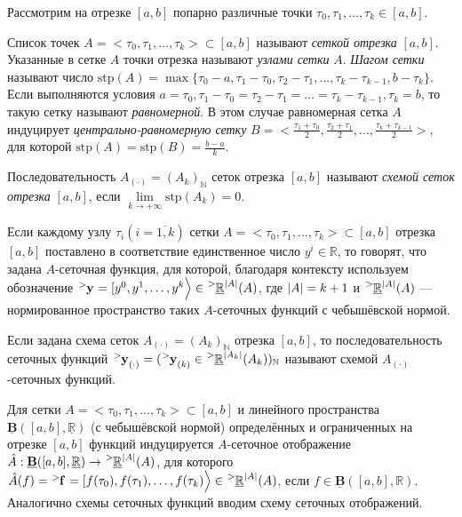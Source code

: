
Рассмотрим на отрезке $[a, b]$ попарно различные точки $\tau_0, \tau_1, \dots, \tau_k \in [a, b]$.

\begin{definition}
	Список точек $A = \Big<\tau_0, \tau_1, \dots, \tau_k\Big> \subset [a, b]$ называют \textit{сеткой отрезка} $[a, b]$. Указанные в сетке $A$ точки отрезка называют \textit{узлами сетки} $A$. \textit{Шагом сетки} называют число $\mathrm{stp}(A) = \max\{\tau_0 - a, \tau_1 - \tau_0, \tau_2 - \tau_1, \dotsc, \tau_k - \tau_{k - 1}, b - \tau_k\}$. Если выполняются условия $a = \tau_0, \tau_1 - \tau_0 = \tau_2 - \tau_1 = \dotsc = \tau_k - \tau_{k - 1}, \tau_k = b$, то такую сетку называют \textit{равномерной}. В этом случае равномерная сетка $A$ индуцирует \textit{центрально-равномерную сетку} $B = \Big<\frac{\tau_1 + \tau_0}{2}, \frac{\tau_2 + \tau_1}{2}, \dotsc, \frac{\tau_k + \tau_{k - 1}}{2}\Big>$, для которой $\mathrm{stp}(A) = \mathrm{stp}(B) = \frac{b - a}{k}$. 
	
	Последовательность $A_{(\cdot)} = (A_k)_{\mathbb{N}}$ сеток отрезка $[a, b]$ называют \textit{схемой сеток отрезка} $[a, b]$, если $\lim\limits_{k \to +\infty}{\mathrm{stp}(A_k)} = 0$.
	
	Если каждому узлу $\tau_i (i = \overline{1, k})$ сетки $A = \Big<\tau_0, \tau_1, \dotsc, \tau_k\Big> \subset [a, b]$ отрезка $[a, b]$ поставлено в соответствие единственное число $y^i \in \mathbb{R}$, то говорят, что задана $A$-сеточная функция, для которой, благодаря контексту используем обозначение $\tensor[^{>}]{\mathbf{y}}{} = [y^0, y^1, \dotsc, y^k\Big> \in \tensor[^{>}]{\underline{\mathbb{R}}}{^{\abs{A}}}(A)$, где $\abs{A} = k + 1$ и $\tensor[^{>}]{\underline{\mathbb{R}}}{^{\abs{A}}}(A)$ --- нормированное пространство таких $A$-сеточных функций с чебышёвской нормой.  
	
	Если задана схема сеток $A_{(\cdot)} = (A_k)_{\mathbb{N}}$ отрезка $[a, b]$, то последовательность сеточных функций $\tensor[^{>}]{\mathbf{y}}{_{(\cdot)}} = (\tensor[^{>}]{\mathbf{y}}{_{(k)}} \in \tensor[^{>}]{\underline{\mathbb{R}}}{^{\abs{A_k}}}(A_k))_{\mathbb{N}}$ называют схемой $A_{(\cdot)}$-сеточных функций. 
	
	Для сетки $A = \Big<\tau_0, \tau_1, \dotsc, \tau_k\Big> \subset [a, b]$ и линейного пространства $\underline{\mathbf{B}}([a, b], \underline{\mathbb{R}})$ (с чебышёвской нормой) определённых и ограниченных на отрезке $[a, b]$ функций индуцируется $A$-сеточное отображение $\hat{A}: \underline{\mathbf{B}}([a, b], \underline{\mathbb{R}}) \to \tensor[^{>}]{\underline{\mathbb{R}}}{^{\abs{A}}}(A)$, для которого $\hat{A}(f) = \tensor[^{>}]{\mathbf{f}}{} = [f(\tau_0), f(\tau_1), \dotsc, f(\tau_k)\Big> \in \tensor[^{>}]{\underline{\mathbb{R}}}{^{\abs{A}}}(A)$, если $f \in \underline{\mathbf{B}}([a, b], \mathbb{R})$. Аналогично схемы сеточных функций вводим схему сеточных отображений. 
\end{definition}